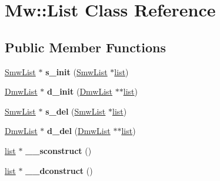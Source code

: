 \hypertarget{class_mw_1_1_list}{\section{Mw\-:\-:List Class Reference}
\label{class_mw_1_1_list}
}
\subsection*{Public Member Functions}
\begin{DoxyCompactItemize}
\item 
\hypertarget{class_mw_1_1_list_a32dee50886bb21ce863b5c837322227c}{\hyperlink{struct_mw__list}{Smw\-List} $\ast$ {\bfseries s\-\_\-init} (\hyperlink{struct_mw__list}{Smw\-List} $\ast$\hyperlink{structa__list}{list})}\label{class_mw_1_1_list_a32dee50886bb21ce863b5c837322227c}

\item 
\hypertarget{class_mw_1_1_list_afc3caaa45d7691e8ad01fcaa214429f3}{\hyperlink{structd__mw__list}{Dmw\-List} $\ast$ {\bfseries d\-\_\-init} (\hyperlink{structd__mw__list}{Dmw\-List} $\ast$$\ast$\hyperlink{structa__list}{list})}\label{class_mw_1_1_list_afc3caaa45d7691e8ad01fcaa214429f3}

\item 
\hypertarget{class_mw_1_1_list_abfc19f51bf78abed2ee179b772404ca2}{\hyperlink{struct_mw__list}{Smw\-List} $\ast$ {\bfseries s\-\_\-del} (\hyperlink{struct_mw__list}{Smw\-List} $\ast$\hyperlink{structa__list}{list})}\label{class_mw_1_1_list_abfc19f51bf78abed2ee179b772404ca2}

\item 
\hypertarget{class_mw_1_1_list_a4d90769b9e58df0bd7d14c06c56cb8d0}{\hyperlink{structd__mw__list}{Dmw\-List} $\ast$ {\bfseries d\-\_\-del} (\hyperlink{structd__mw__list}{Dmw\-List} $\ast$$\ast$\hyperlink{structa__list}{list})}\label{class_mw_1_1_list_a4d90769b9e58df0bd7d14c06c56cb8d0}

\item 
\hypertarget{class_mw_1_1_list_aeb9b5d50849b8dd7e0a5ce55692b280c}{\hyperlink{structa__list}{list} $\ast$ {\bfseries \-\_\-\-\_\-sconstruct} ()}\label{class_mw_1_1_list_aeb9b5d50849b8dd7e0a5ce55692b280c}

\item 
\hypertarget{class_mw_1_1_list_a6e0f77ac46860bc146ef591e6d06a63a}{\hyperlink{structa__list}{list} $\ast$ {\bfseries \-\_\-\-\_\-dconstruct} ()}\label{class_mw_1_1_list_a6e0f77ac46860bc146ef591e6d06a63a}


\end{DoxyCompactItemize}
